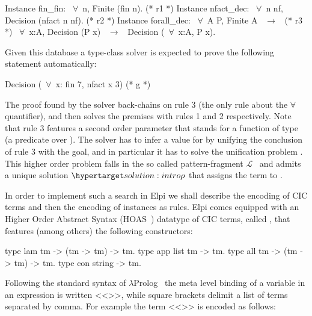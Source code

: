 \documentclass[sigconf,natbib=false,review]{acmart}
\newcommand{\llambda}{\ensuremath{\mathcal{L}}\xspace}
\begin{document}
\begin{coqcode}
Instance fin_fin: ~$\forall$~n, Finite (fin n).             (* r1 *)
Instance nfact_dec: ~$\forall$~n nf, Decision (nfact n nf). (* r2 *)
Instance forall_dec: ~$\forall$~A P, Finite A ~$\to$~            (* r3 *)
  ~$\forall$~x:A, Decision (P x) ~$\to$~ Decision (~$\forall$~x:A, P x).
\end{coqcode}

\noindent Given this database a type-class solver is expected to
prove the following statement automatically:

\begin{coqcode}
  Decision (~$\forall$~x: fin 7, nfact x 3)                   (* g *)
\end{coqcode}

\noindent
The proof found by the solver back-chains on rule 3 (the only rule
about the $\forall$ quantifier), and then solves the premises with
rules 1 and 2 respectively.
Note that rule 3 features a second order parameter  that stands for
a function of type  (a predicate over ).
The solver has to infer a value for  by unifying the conclusion
of rule 3 with the goal, and in particular it has to solve the unification
problem . This higher order problem falls in the so
called pattern-fragment \llambda~\cite{miller92jsc} and admits a unique
solution $\customlabel{solution:intro}{\rho}$ that assigns
the term  to .

In order to implement such a search in Elpi we shall describe the encoding
of CIC terms and then the encoding of instances as rules.
Elpi comes equipped with
an Higher Order Abstract Syntax (HOAS~\cite{10.1145/53990.54010}) datatype of CIC
terms, called , that features (among others) the following
constructors:

\begin{elpicode}
type lam  tm -> (tm -> tm) -> tm.     %
type app  list tm -> tm.              %
type all  tm -> (tm -> tm) -> tm.     %
type con  string -> tm.               %
\end{elpicode}

\noindent
Following the standard syntax of $\lambda$Prolog~\cite{miller_nadathur_2012}
the meta level binding of a variable  in an expression
 is written <<>>, while square brackets delimit a
list of terms separated by comma. For example the term
<<>> is encoded as follows:
\end{document}
